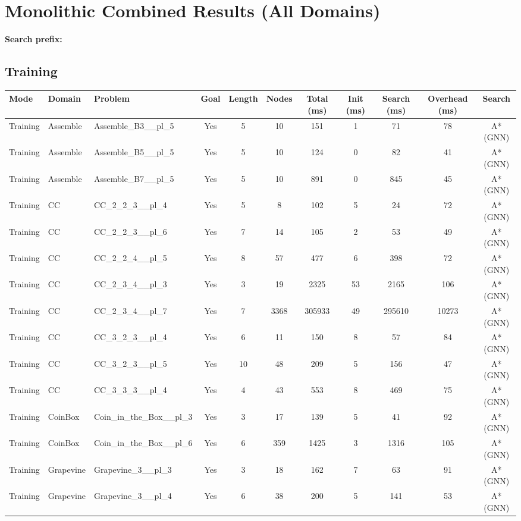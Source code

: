 \documentclass{article}
\begin{document}
\section*{Monolithic Combined Results (All Domains)}
\textbf{Search prefix:} 
\\[0.5cm]
\subsection*{Training}
\begin{tabular}{lllcccccccc}
\toprule
Mode & Domain & Problem & Goal & Length & Nodes & Total (ms) & Init (ms) & Search (ms) & Overhead (ms) & Search \\
\midrule
Training & Assemble & Assemble\_B3\_\_pl\_5 & Yes & 5 & 10 & 151 & 1 & 71 & 78 & A*(GNN) \\
Training & Assemble & Assemble\_B5\_\_pl\_5 & Yes & 5 & 10 & 124 & 0 & 82 & 41 & A*(GNN) \\
Training & Assemble & Assemble\_B7\_\_pl\_5 & Yes & 5 & 10 & 891 & 0 & 845 & 45 & A*(GNN) \\
Training & CC & CC\_2\_2\_3\_\_pl\_4 & Yes & 5 & 8 & 102 & 5 & 24 & 72 & A*(GNN) \\
Training & CC & CC\_2\_2\_3\_\_pl\_6 & Yes & 7 & 14 & 105 & 2 & 53 & 49 & A*(GNN) \\
Training & CC & CC\_2\_2\_4\_\_pl\_5 & Yes & 8 & 57 & 477 & 6 & 398 & 72 & A*(GNN) \\
Training & CC & CC\_2\_3\_4\_\_pl\_3 & Yes & 3 & 19 & 2325 & 53 & 2165 & 106 & A*(GNN) \\
Training & CC & CC\_2\_3\_4\_\_pl\_7 & Yes & 7 & 3368 & 305933 & 49 & 295610 & 10273 & A*(GNN) \\
Training & CC & CC\_3\_2\_3\_\_pl\_4 & Yes & 6 & 11 & 150 & 8 & 57 & 84 & A*(GNN) \\
Training & CC & CC\_3\_2\_3\_\_pl\_5 & Yes & 10 & 48 & 209 & 5 & 156 & 47 & A*(GNN) \\
Training & CC & CC\_3\_3\_3\_\_pl\_4 & Yes & 4 & 43 & 553 & 8 & 469 & 75 & A*(GNN) \\
Training & CoinBox & Coin\_in\_the\_Box\_\_pl\_3 & Yes & 3 & 17 & 139 & 5 & 41 & 92 & A*(GNN) \\
Training & CoinBox & Coin\_in\_the\_Box\_\_pl\_6 & Yes & 6 & 359 & 1425 & 3 & 1316 & 105 & A*(GNN) \\
Training & Grapevine & Grapevine\_3\_\_pl\_3 & Yes & 3 & 18 & 162 & 7 & 63 & 91 & A*(GNN) \\
Training & Grapevine & Grapevine\_3\_\_pl\_4 & Yes & 6 & 38 & 200 & 5 & 141 & 53 & A*(GNN) \\

\end{tabular}
\end{document}
